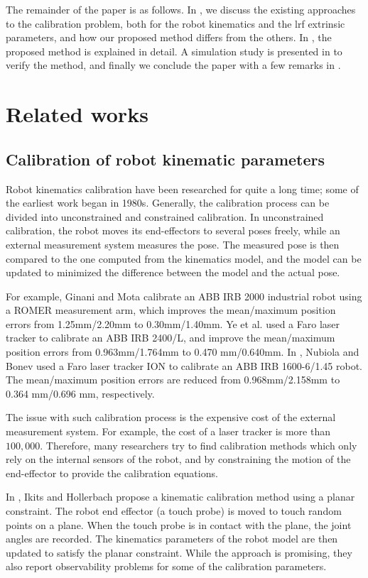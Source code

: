The remainder of the paper is as follows. In , we discuss the existing approaches to the calibration problem, both for the robot kinematics and the \ac{lrf} extrinsic parameters, and how our proposed method differs from the others. In , the proposed method is explained in detail. A simulation study is presented in  to verify the method, and finally we conclude the paper with a few remarks in .  

\section{Related works}
\label{sec:related}
\subsection{Calibration of robot kinematic parameters}
\label{sec:kine_calib}
Robot kinematics calibration have been researched for quite a long time; some of the earliest work began in 1980s. Generally, the calibration process can be divided into unconstrained and constrained calibration. In unconstrained calibration, the robot moves its end-effectors to several poses freely, while an external measurement system measures the pose. The measured pose is then compared to the one computed from the kinematics model, and the model can be updated to minimized the difference between the model and the actual pose. 

For example, Ginani and Mota \cite{Ginani2011} calibrate an ABB IRB 2000 industrial robot using a ROMER measurement arm, which improves the mean/maximum position errors from 1.25mm/2.20mm to 0.30mm/1.40mm. Ye et al. \cite{Ye2006} used a Faro laser tracker to calibrate an ABB IRB 2400/L, and improve the mean/maximum position errors from 0.963mm/1.764mm to 0.470 mm/0.640mm. In \cite{Nubiola2013}, Nubiola and Bonev used a Faro laser tracker ION to calibrate an ABB IRB 1600-6/1.45 robot. The mean/maximum position errors are reduced from 0.968mm/2.158mm to 0.364 mm/0.696 mm, respectively.

The issue with such calibration process is the expensive cost of the external measurement system. For example, the cost of a laser tracker is more than $100,000$\cite{Nubiola2013}. Therefore, many researchers try to find calibration methods which only rely on the internal sensors of the robot, and by constraining the motion of the end-effector to provide the calibration equations. 

In \cite{Ikits1997}, Ikits and Hollerbach propose a kinematic calibration method using a planar constraint. The robot end effector (a touch probe) is moved to touch random points on a plane. When the touch probe is in contact with the plane, the joint angles are recorded. The kinematics parameters of the robot model are then updated to satisfy the planar constraint. While the approach is promising, they also report observability problems for some of the calibration parameters.  

